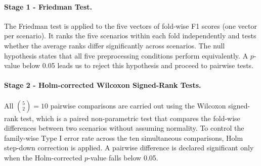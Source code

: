 \documentclass[a4paper,10pt]{article}
\begin{document}
\paragraph{Stage 1 - Friedman Test.}
The Friedman test \citep{demsarstats} is applied to the five vectors of
fold-wise F1 scores (one vector per scenario). It ranks the five
scenarios within each fold independently and tests whether the average ranks
differ significantly across scenarios. The null hypothesis states that all
five preprocessing conditions perform equivalently. A $p$-value below 0.05
leads us to reject this hypothesis and proceed to pairwise tests.
\paragraph{Stage 2 - Holm-corrected Wilcoxon Signed-Rank Tests.}
All $\binom{5}{2} = 10$ pairwise comparisons are carried out using the
Wilcoxon signed-rank test, which is a paired non-parametric test that
compares the fold-wise differences between two scenarios without assuming
normality. To control the family-wise Type I error rate across the ten
simultaneous comparisons, Holm step-down correction is applied. A pairwise
difference is declared significant only when the Holm-corrected $p$-value
falls below 0.05.
\end{document}
